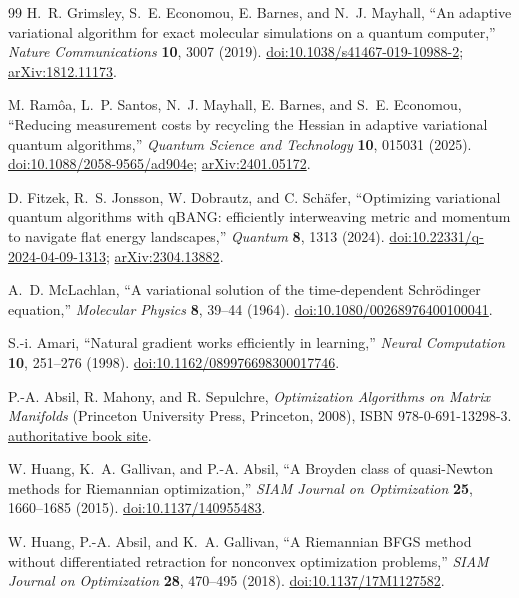 \documentclass[10pt,twocolumn]{article}
\theoremstyle{definition}
\theoremstyle{remark}
\begin{document}
{\begin{thebibliography}{99}
H.~R. Grimsley, S.~E. Economou, E. Barnes, and N.~J. Mayhall,
“An adaptive variational algorithm for exact molecular simulations on a quantum computer,”
\emph{Nature Communications} \textbf{10}, 3007 (2019).
\href{https://doi.org/10.1038/s41467-019-10988-2}{doi:10.1038/s41467-019-10988-2};
\href{https://arxiv.org/abs/1812.11173}{arXiv:1812.11173}.

M. Ram\^oa, L.~P. Santos, N.~J. Mayhall, E. Barnes, and S.~E. Economou,
“Reducing measurement costs by recycling the Hessian in adaptive variational quantum algorithms,”
\emph{Quantum Science and Technology} \textbf{10}, 015031 (2025).
\href{https://doi.org/10.1088/2058-9565/ad904e}{doi:10.1088/2058-9565/ad904e};
\href{https://arxiv.org/abs/2401.05172}{arXiv:2401.05172}.

D. Fitzek, R.~S. Jonsson, W. Dobrautz, and C. Sch\"afer,
“Optimizing variational quantum algorithms with qBANG: efficiently interweaving metric and momentum to navigate flat energy landscapes,”
\emph{Quantum} \textbf{8}, 1313 (2024).
\href{https://doi.org/10.22331/q-2024-04-09-1313}{doi:10.22331/q-2024-04-09-1313};
\href{https://arxiv.org/abs/2304.13882}{arXiv:2304.13882}.

A.~D. McLachlan,
“A variational solution of the time-dependent Schr\"odinger equation,”
\emph{Molecular Physics} \textbf{8}, 39--44 (1964).
\href{https://doi.org/10.1080/00268976400100041}{doi:10.1080/00268976400100041}.

S.-i. Amari,
“Natural gradient works efficiently in learning,”
\emph{Neural Computation} \textbf{10}, 251--276 (1998).
\href{https://doi.org/10.1162/089976698300017746}{doi:10.1162/089976698300017746}.

P.-A. Absil, R. Mahony, and R. Sepulchre,
\emph{Optimization Algorithms on Matrix Manifolds}
(Princeton University Press, Princeton, 2008), ISBN 978-0-691-13298-3.
\href{https://sites.uclouvain.be/absil/amsbook/}{authoritative book site}.

W. Huang, K.~A. Gallivan, and P.-A. Absil,
“A Broyden class of quasi-Newton methods for Riemannian optimization,”
\emph{SIAM Journal on Optimization} \textbf{25}, 1660--1685 (2015).
\href{https://doi.org/10.1137/140955483}{doi:10.1137/140955483}.

W. Huang, P.-A. Absil, and K.~A. Gallivan,
“A Riemannian BFGS method without differentiated retraction for nonconvex optimization problems,”
\emph{SIAM Journal on Optimization} \textbf{28}, 470--495 (2018).
\href{https://doi.org/10.1137/17M1127582}{doi:10.1137/17M1127582}.


\end{thebibliography}}
\end{document}
